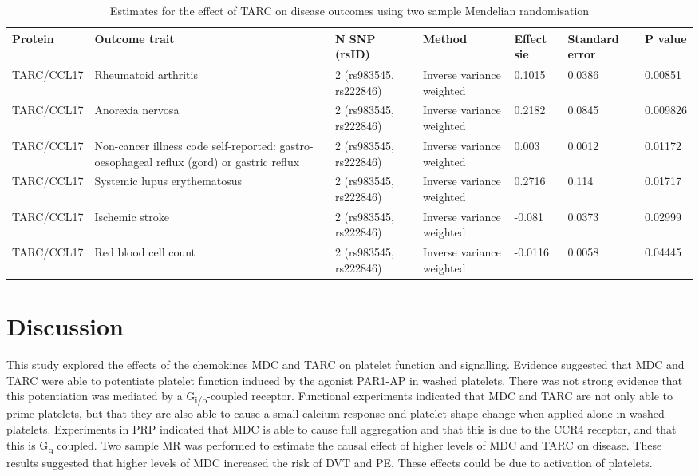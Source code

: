 \documentclass[11pt,twoside]{bristolthesis}
\begin{document}
\begin{landscape}\begin{table}

\caption{\label{tab:TARC-disease-MR}Estimates for the effect of TARC on disease outcomes using two sample Mendelian randomisation}
\centering
\fontsize{10}{12}\selectfont
\begin{tabu} to 
\toprule
Protein & Outcome trait & N SNP (rsID) & Method & Effect sie & Standard error & P value\\
\midrule
TARC/CCL17 & Rheumatoid arthritis & 2 (rs983545, rs222846) & Inverse variance weighted & 0.1015 & 0.0386 & 0.00851\\
TARC/CCL17 & Anorexia nervosa & 2 (rs983545, rs222846) & Inverse variance weighted & 0.2182 & 0.0845 & 0.009826\\
TARC/CCL17 & Non-cancer illness code self-reported: gastro-oesophageal reflux (gord) or gastric reflux & 2 (rs983545, rs222846) & Inverse variance weighted & 0.003 & 0.0012 & 0.01172\\
TARC/CCL17 & Systemic lupus erythematosus & 2 (rs983545, rs222846) & Inverse variance weighted & 0.2716 & 0.114 & 0.01717\\
TARC/CCL17 & Ischemic stroke & 2 (rs983545, rs222846) & Inverse variance weighted & -0.081 & 0.0373 & 0.02999\\
\addlinespace
TARC/CCL17 & Red blood cell count & 2 (rs983545, rs222846) & Inverse variance weighted & -0.0116 & 0.0058 & 0.04445\\
\bottomrule
\end{tabu}
\end{table}
\end{landscape}
\hypertarget{discussion-2}{%
\section{Discussion}\label{discussion-2}}

This study explored the effects of the chemokines MDC and TARC on platelet function and signalling. Evidence suggested that MDC and TARC were able to potentiate platelet function induced by the agonist PAR1-AP in washed platelets. There was not strong evidence that this potentiation was mediated by a G\textsubscript{i/o}-coupled receptor. Functional experiments indicated that MDC and TARC are not only able to prime platelets, but that they are also able to cause a small calcium response and platelet shape change when applied alone in washed platelets. Experiments in PRP indicated that MDC is able to cause full aggregation and that this is due to the CCR4 receptor, and that this is G\textsubscript{q} coupled. Two sample MR was performed to estimate the causal effect of higher levels of MDC and TARC on disease. These results suggested that higher levels of MDC increased the risk of DVT and PE. These effects could be due to activation of platelets.
\end{document}
